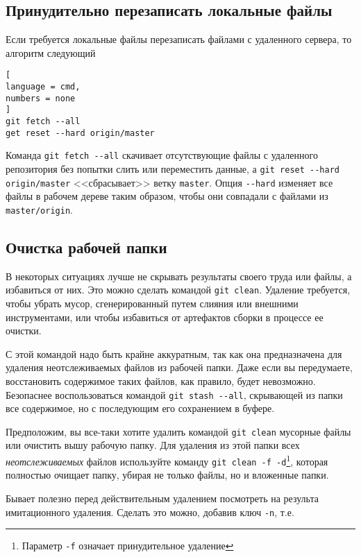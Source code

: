 \documentclass[%
	11pt,
	a4paper,
	utf8,
		]{article}
\begin{document}
\subsection{Принудительно перезаписать локальные файлы}

Если требуется локальные файлы перезаписать файлами с удаленного сервера, то алгоритм следующий

\begin{lstlisting}[
language = cmd,
numbers = none
]
git fetch --all
get reset --hard origin/master
\end{lstlisting}

Команда \lstinline{git fetch --all} скачивает отсутствующие файлы с удаленного репозитория без попытки слить или переместить данные, а \lstinline{git reset --hard origin/master} <<сбрасывает>> ветку \texttt{master}. Опция \lstinline{--hard} изменяет все файлы в рабочем дереве таким образом, чтобы они совпадали с файлами из \texttt{master/origin}.

\subsection{Очистка рабочей папки}

В некоторых ситуациях лучше не скрывать результаты своего труда или файлы, а избавиться от них. Это можно сделать командой \texttt{git clean}. Удаление требуется, чтобы убрать мусор, сгенерированный путем слияния или внешними инструментами, или чтобы избавиться от артефактов сборки в процессе ее очистки.

С этой командой надо быть крайне аккуратным, так как она предназначена для удаления неотслеживаемых файлов из рабочей папки. Даже если вы передумаете, восстановить содержимое таких файлов, как правило, будет невозможно. Безопаснее воспользоваться командой \lstinline{git stash --all}, скрывающей из папки все содержимое, но с последующим его сохранением в буфере.

Предположим, вы все-таки хотите удалить командой \lstinline{git clean} мусорные файлы или очистить вышу рабочую папку. Для удаления из этой папки всех \emph{неотслеживаемых} файлов используйте команду \lstinline{git clean -f -d}\footnote{Параметр \lstinline{-f} означает принудительное удаление}, которая полностью очищает папку, убирая не только файлы, но и вложенные папки.

Бывает полезно перед действительным удалением посмотреть на результа имитационного удаления. Сделать это можно, добавив ключ \lstinline{-n}, т.е.
\end{document}
